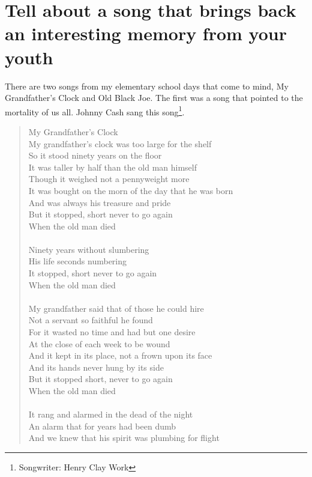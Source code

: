 \section{Tell about a song that brings back an interesting memory from your youth}
There are two songs from my elementary school days that come to mind, My Grandfather's Clock and Old Black Joe. 
The first was a song that pointed to the mortality of us all. 
Johnny Cash sang this song\footnote{Songwriter: Henry Clay Work}.
\begin{quotation}
My Grandfather's Clock \\
My grandfather's clock was too large for the shelf \\
So it stood ninety years on the floor \\
It was taller by half than the old man himself \\
Though it weighed not a pennyweight more \\
It was bought on the morn of the day that he was born \\
And was always his treasure and pride \\
But it stopped, short never to go again \\
When the old man died \\ \\
Ninety years without slumbering \\
His life seconds numbering \\
It stopped, short never to go again \\
When the old man died \\ \\
My grandfather said that of those he could hire \\
Not a servant so faithful he found \\
For it wasted no time and had but one desire \\
At the close of each week to be wound \\
And it kept in its place, not a frown upon its face \\
And its hands never hung by its side \\
But it stopped short, never to go again \\
When the old man died \\ \\
It rang and alarmed in the dead of the night \\
An alarm that for years had been dumb \\
And we knew that his spirit was plumbing for flight \\

\end{quotation}
